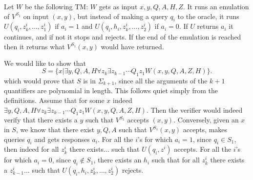 \documentclass[11pt]{article} \usepackage{amssymb}
\begin{document}
\begin{enumerate}
\begin{enumerate}
        Let $W$ be the following TM: $W$ gets as input $x,y,Q,A,H,Z$. It runs
        an emulation of $V^{S_1}$ on input $(x,y)$, but instead of making a 
        query $q_i$ to the oracle, it runs $U(q_i,z_k^i,\ldots,z_1^i)$ 
        if $a_i=1$ and 
        $U(q_i,h_i,z_k^i,\ldots,z_2^i)$ if $a_i=0$. If
        $U$ returns $a_i$ it continues, and if not it stops and rejects. If the
        end of the emulation is reached then it returns what $V^{S_1}(x,y)$ 
        would have returned. 

        We would like to show that
        \begin{equation*}
          S=\{x | \exists y,Q,A,H\forall z_k \exists z_{k-1} \cdots Q_1z_1 
                     W(x,y,Q,A,Z,H)\}.
        \end{equation*}
        which would prove that $S$ is in $\Sigma_{k+1}$, since all the arguments
        of the $k+1$ quantifiers are polynomial in length. This
        follows quiet simply from the definitions. Assume that for some
        $x$ indeed 
        $\exists y,Q,A,H\forall z_k \exists z_{k-1} \cdots Q_1z_1 W(x,y,Q,A,Z,H)$. Then the verifier would indeed
        verify that there exists a $y$ such that $V^{S_1}$ accepts 
        $(x,y)$. Conversely, given an $x$ in $S$, we know that there exist
        $y,Q,A$ such that $V^{S_1}(x,y)$ accepts, makes queries $q_i$ and
        gets responses $a_i$. For all the $i$'s for which $a_i=1$, since $q_i\in S_1$,
        then indeed for all $z_k^i$ there exists... such that $U(q_i,z^i)$
        accepts. For all the $i$'s for which $a_i=0$, since $q_i\not\in S_1$, 
        there exists an $h_i$ such that for all $z_k^i$ there exists a $z_{k-1}^i$...
        such that $U(q_i,h_i,z_{k}^i,\ldots,z_2^i)$ rejects.
        
        




    \end{enumerate}
    

\end{enumerate}
\end{document}
